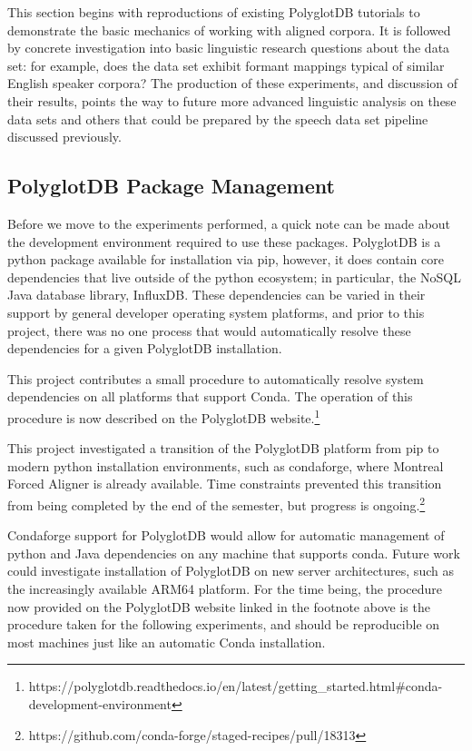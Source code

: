 \documentclass[11pt]{article}
\begin{document}
This section begins with reproductions of existing PolyglotDB tutorials to demonstrate the basic mechanics of working with aligned corpora. It is followed by concrete investigation into basic linguistic research questions about the data set: for example, does the data set exhibit formant mappings typical of similar English speaker corpora? The production of these experiments, and discussion of their results, points the way to future more advanced linguistic analysis on these data sets and others that could be prepared by the speech data set pipeline discussed previously.

\subsection{PolyglotDB Package Management}

Before we move to the experiments performed, a quick note can be made about the development environment required to use these packages. PolyglotDB is a python package available for installation via pip, however, it does contain core dependencies that live outside of the python ecosystem; in particular, the NoSQL Java database library, InfluxDB. These dependencies can be varied in their support by general developer operating system platforms, and prior to this project, there was no one process that would automatically resolve these dependencies for a given PolyglotDB installation.

This project contributes a small procedure to automatically resolve system dependencies on all platforms that support Conda. The operation of this procedure is now described on the PolyglotDB website.\footnote{https://polyglotdb.readthedocs.io/en/latest/getting\_started.html\#conda-development-environment}

This project investigated a transition of the PolyglotDB platform from pip to modern python installation environments, such as condaforge\cite{}, where Montreal Forced Aligner is already available. Time constraints prevented this transition from being completed by the end of the semester, but progress is ongoing.\footnote{https://github.com/conda-forge/staged-recipes/pull/18313}

Condaforge support for PolyglotDB would allow for automatic management of python and Java dependencies on any machine that supports conda. Future work could investigate installation of PolyglotDB on new server architectures, such as the increasingly available ARM64 platform. For the time being, the procedure now provided on the PolyglotDB website linked in the footnote above is the procedure taken for the following experiments, and should be reproducible on most machines just like an automatic Conda installation. 
\end{document}
